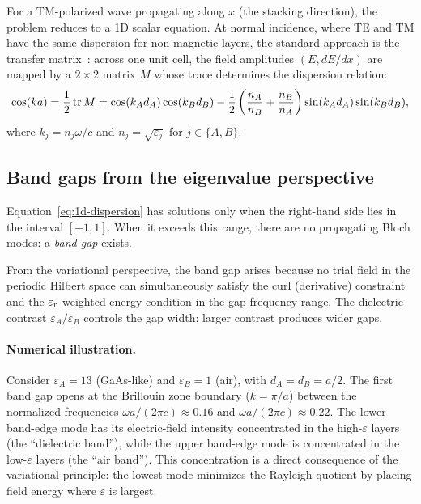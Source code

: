 For a TM-polarized wave propagating along $x$ (the stacking direction),
the problem reduces to a 1D scalar equation. At normal incidence, where
TE and TM have the same dispersion for non-magnetic layers, the standard
approach is the transfer matrix~\cite{raman2010photonic}: across one unit
cell, the field amplitudes $(E, dE/dx)$ are mapped by a $2 \times 2$
matrix $M$ whose trace determines the dispersion relation:
\begin{equation}
 \cos(ka) = \frac{1}{2}\operatorname{tr} M
 = \cos(k_A d_A)\cos(k_B d_B)
 - \frac{1}{2}\left(\frac{n_A}{n_B} + \frac{n_B}{n_A}\right)
 \sin(k_A d_A)\sin(k_B d_B),
 \label{eq:1d-dispersion}
\end{equation}
where $k_j = n_j\omega/c$ and $n_j = \sqrt{\varepsilon_j}$ for
$j \in \{A, B\}$.

\subsection{Band gaps from the eigenvalue perspective}
\label{ssec:1d-gaps}

Equation~\eqref{eq:1d-dispersion} has solutions only when the right-hand
side lies in the interval $[-1, 1]$. When it exceeds this range, there are
no propagating Bloch modes: a \emph{band gap} exists.

From the variational perspective, the band gap arises because no trial
field in the periodic Hilbert space can simultaneously satisfy the curl
(derivative) constraint and the $\varepsilon_{\mathrm{r}}$-weighted energy condition in the
gap frequency range. The dielectric contrast $\varepsilon_A/\varepsilon_B$
controls the gap width: larger contrast produces wider gaps.

\paragraph{Numerical illustration.}
Consider $\varepsilon_A = 13$ (GaAs-like) and $\varepsilon_B = 1$ (air),
with $d_A = d_B = a/2$. The first band gap opens at the Brillouin zone
boundary ($k = \pi/a$) between the normalized frequencies
$\omega a/(2\pi c) \approx 0.16$ and $\omega a/(2\pi c) \approx 0.22$.
The lower band-edge mode has its electric-field intensity concentrated
in the high-$\varepsilon$ layers (the ``dielectric band''), while the
upper band-edge mode is concentrated in the low-$\varepsilon$ layers
(the ``air band''). This concentration is a direct consequence of the
variational principle: the lowest mode minimizes the Rayleigh quotient
by placing field energy where $\varepsilon$ is largest.

